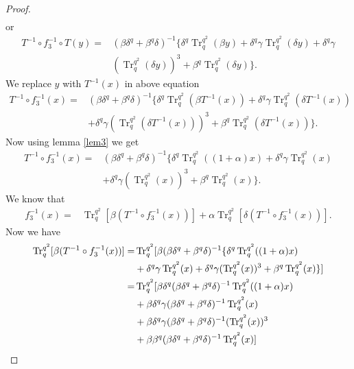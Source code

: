 \documentclass[10pt,a4paper]{amsart}
\begin{document}
\begin{proof}
\begin{align*}
\end{align*}
	or
	\begin{align*}
	T^{-1}\circ f_3^{-1}\circ T(y)=&(\beta\delta^{q}+\beta^{q}\delta)^{-1}\{\delta^{q}\operatorname{Tr}_{q}^{q^2}(\beta y)+\delta^{q}\gamma\operatorname{Tr}_{q}^{q^2}(\delta y)+\delta^{q}\gamma\\&(\operatorname{Tr}_{q}^{q^2}(\delta y))^3+\beta^{q}\operatorname{Tr}_{q}^{q^2}(\delta y)\}.
\end{align*}
	We replace $y$ with $T^{-1}(x)$ in above equation
	\begin{align*}
		T^{-1}\circ f_3^{-1}(x)=&(\beta\delta^{q}+\beta^{q}\delta)^{-1}\{\delta^{q}\operatorname{Tr}_{q}^{q^2}(\beta T^{-1}(x))+\delta^{q}\gamma\operatorname{Tr}_{q}^{q^2}(\delta T^{-1}(x))\\&+\delta^{q}\gamma(\operatorname{Tr}_{q}^{q^2}(\delta T^{-1}(x)))^3+\beta^{q}\operatorname{Tr}_{q}^{q^2}(\delta T^{-1}(x))\}.
	\end{align*}
	Now using lemma \ref{lem3} we get
	\begin{align*}
		T^{-1}\circ f_3^{-1}(x)=&(\beta\delta^{q}+\beta^{q}\delta)^{-1}\{\delta^{q}\operatorname{Tr}_{q}^{q^2}((1+\alpha)x)+\delta^{q}\gamma\operatorname{Tr}_{q}^{q^2}(x)\\&+\delta^{q}\gamma(\operatorname{Tr}_{q}^{q^2}(x))^3+\beta^{q}\operatorname{Tr}_{q}^{q^2}(x)\}.
	\end{align*}
	 We know that
	\begin{align}
		f_3^{-1}(x)=&\operatorname{Tr}_{q}^{q^2}[\beta (T^{-1}\circ f_3^{-1}(x))]+\alpha\operatorname{Tr}_{q}^{q^2}[\delta (T^{-1}\circ f_3^{-1}(x))].
		\label{3c}
	\end{align}
		Now we have
	\begin{align}
		\operatorname{Tr}_{q}^{q^2}[\beta (T^{-1}\circ f_3^{-1}(x))]=&\operatorname{Tr}_{q}^{q^2}[\beta (\beta\delta^{q}+\beta^{q}\delta)^{-1}\{\delta^{q}\operatorname{Tr}_{q}^{q^2}((1+\alpha)x)\notag\\&+\delta^{q}\gamma\operatorname{Tr}_{q}^{q^2}(x)+\delta^{q}\gamma(\operatorname{Tr}_{q}^{q^2}(x))^3+\beta^{q}\operatorname{Tr}_{q}^{q^2}(x)\}]\notag\\
		=&\operatorname{Tr}_{q}^{q^2}[\beta\delta^{q}(\beta\delta^{q}+\beta^{q}\delta)^{-1}\operatorname{Tr}_{q}^{q^2}((1+\alpha)x)\notag\\&+\beta\delta^{q}\gamma(\beta\delta^{q}+\beta^{q}\delta)^{-1}\operatorname{Tr}_{q}^{q^2}(x)\notag\\&+\beta\delta^{q}\gamma(\beta\delta^{q}+\beta^{q}\delta)^{-1}(\operatorname{Tr}_{q}^{q^2}(x))^3\notag\\&+\beta\beta^{q}(\beta\delta^{q}+\beta^{q}\delta)^{-1}\operatorname{Tr}_{q}^{q^2}(x)]\notag\\

\end{align}
\end{proof}
\end{document}
